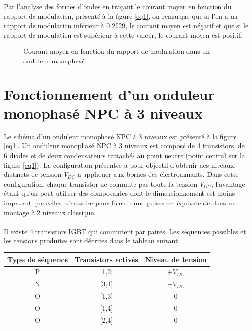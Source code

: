 Par l'analyse des formes d'ondes en traçant le courant moyen en fonction du rapport de modulation, présenté à la figure \ref{eq1}, on remarque que si l'on a un rapport de modulation inférieur à 0.2929, le courant moyen est négatif et que si le rapport de modulation est supérieur à cette valeur, le courant moyen est positif.

\begin{figure}[htb]
\caption{Courant moyen en fonction du rapport de modulation dans un onduleur monophasé}
\end{figure}

\section{Fonctionnement d'un onduleur monophasé NPC à 3 niveaux}
Le schéma d'un onduleur monophasé NPC à 3 niveaux est présenté à la figure \ref{eq1}. Un onduleur monophasé NPC à 3 niveaux est composé de 4 transistors, de 6 diodes et de deux condensateurs rattachés au point neutre (point central sur la figure \ref{eq1}). La configuration présentée a pour objectif d'obtenir des niveaux distincts de tension $V_{DC}$ à appliquer aux bornes des électroaimants. Dans cette configuration, chaque transistor ne commute pas toute la tension $V_{DC}$, l'avantage étant qu'on peut utiliser des composantes dont le dimensionnement est moins imposant que celles nécessaire pour fournir une puissance équivalente dans un montage à 2 niveaux classique. 

\paragraph{}Il existe 4 transistors IGBT qui commutent par paires. Les séquences possibles et les tensions produites sont décrites dans le tableau suivant:

\begin{table}[htb]
\centering
\begin{tabular}{ |c|c|c| }
\hline
  Type de séquence & Transistors activés & Niveau de tension \\\hline\hline
  P & [1,2] & $+V_{DC}$ \\\hline
  N & [3,4] & $-V_{DC}$ \\\hline
  O & [1,3] & $0$ \\\hline
  O & [1,4] & $0$ \\\hline
  O & [2,4] & $0$ \\\hline
\end{tabular}
\end{table}

